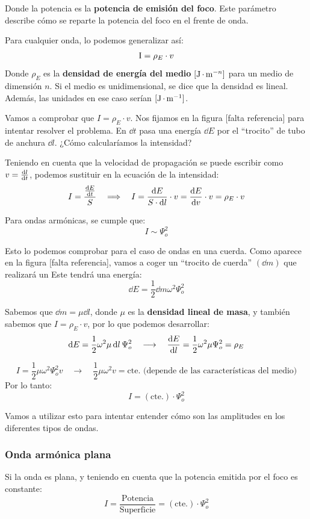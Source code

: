 \documentclass[a4paper]{book}
\begin{document}
Donde la potencia es la \textbf{potencia de emisión del foco}. Este parámetro describe cómo se reparte la potencia del foco en el frente de onda.

Para cualquier onda, lo podemos generalizar así:
\[\operatorname{I} =\rho_E \cdot v\]
Donde $\rho_E$  es la \textbf{densidad de energía del medio} $[\operatorname{J}\cdot \operatorname{m}^{-n}]$ para un medio de dimensión $n$. Si el medio es unidimensional, se dice que la densidad es lineal. Además, las unidades en ese caso serían $[\operatorname{J}\cdot \operatorname{m}^{-1}]$.

Vamos a comprobar que $I = \rho_E \cdot v$. Nos fijamos en la figura [falta referencia] para intentar resolver el problema. En $\dd{t}$ pasa una energía $\dd{E}$ por el ``trocito'' de tubo de anchura $\dd{l}$. ¿Cómo calcularíamos la intensidad?

Teniendo en cuenta que la velocidad de propagación se puede escribir como $v = \dv{l}{t}$, podemos sustituir en la ecuación de la intensidad:
\[I = \frac{\dv{E}{t}}{S} \quad \Longrightarrow \quad I = \frac{\dd{E}}{S\cdot \dd{l}}\cdot v = \dv{E}{v}\cdot v = \rho_E\cdot v\]

Para ondas armónicas, se cumple que:
\[I\sim \Psi_o^2\]

Esto lo podemos comprobar para el caso de ondas en una cuerda. Como aparece en la figura [falta referencia], vamos a coger un ``trocito de cuerda'' $(\dd{m})$ que realizará un \mas\space Este tendrá una energía:
\[\dd{E} = \frac{1}{2}\dd{m}\omega^2\Psi_o^2\]

Sabemos que $\dd{m} = \mu \dd{l}$, donde $\mu$ es la \textbf{densidad lineal de masa}, y también sabemos que $I=\rho_E\cdot v$, por lo que podemos desarrollar:
\[\dd{E} = \frac{1}{2}\omega^2 \mu \dd{l}\Psi_o^2 \quad \longrightarrow \quad \dv{E}{l} = \frac{1}{2}\omega^2\mu\Psi_o^2 = \rho _E\]

\[I=\frac{1}{2}\mu \omega^2\Psi_o^2v \quad \longrightarrow \quad \frac{1}{2}\mu\omega^2v = \text{cte. (depende de las características del medio)}\]
Por lo tanto:
\[I = (\text{cte.})\cdot \Psi_o^2\]

Vamos a utilizar esto para intentar entender cómo son las amplitudes en los diferentes tipos de ondas.

\subsubsection{Onda armónica plana}
Si la onda es plana, y teniendo en cuenta que la potencia emitida por el foco es constante:
\[I = \frac{\text{Potencia}}{\text{Superficie}} = (\text{cte.})\cdot \Psi_o^2\]
\end{document}
